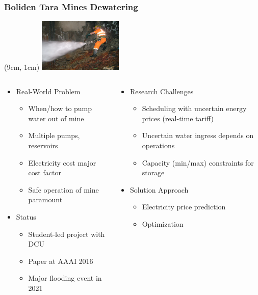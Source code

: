 \begin{frame}
\frametitle{Boliden Tara Mines Dewatering}
\begin{textblock*}{4cm}(9cm,-1cm)
\includegraphics[width=4cm]{images/waterflow}
\end{textblock*}
\vspace{2cm}
\begin{columns}[b]
\begin{column}{0.5\textwidth}
\begin{itemize}
\item Real-World Problem
\begin{itemize}
\item When/how to pump water out of mine
\item Multiple pumps, reservoirs
\item Electricity cost major cost factor
\item Safe operation of mine paramount
\end{itemize}
\item Status
\begin{itemize}
\item Student-led project with DCU
\item Paper at AAAI 2016
\item Major flooding event in 2021
\end{itemize}
\end{itemize}
\end{column}
\begin{column}{0.5\textwidth}
\begin{itemize}
\item Research Challenges
\begin{itemize}
\item Scheduling with uncertain energy prices (real-time tariff)
\item Uncertain water ingress depends on operations
\item Capacity (min/max) constraints for storage 
\end{itemize}
\item Solution Approach
\begin{itemize}
\item Electricity price prediction
\item Optimization
\end{itemize}
\end{itemize}
\end{column}
\end{columns}
\end{frame}

